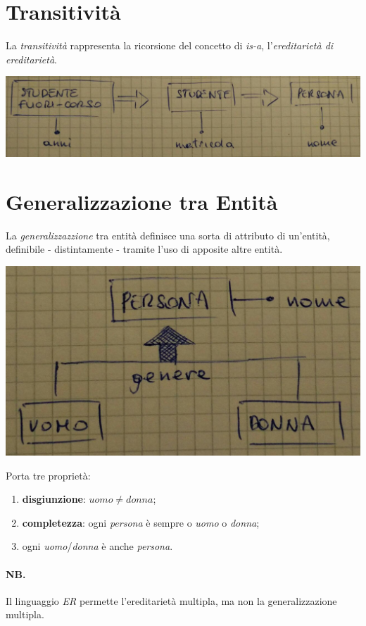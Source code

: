 \section{Transitività}
La \textit{transitività} rappresenta la ricorsione del concetto di \textit{is-a}, l'\textit{ereditarietà di ereditarietà}.
\begin{center}
    \includegraphics[width=.7\textwidth]{res/er-studentefuoricorso-studente-persona.jpg} \hfill
\end{center}

\section{Generalizzazione tra Entità}
La \textit{generalizzazzione} tra entità definisce una sorta di attributo di un'entità, definibile - distintamente - tramite l'uso di apposite altre entità.
\begin{center}
    \includegraphics[width=.5\textwidth]{res/er-persona-uomo-donna.jpg} \hfill
\end{center}
Porta tre proprietà:
\begin{enumerate}
    \item \textbf{disgiunzione}: $uomo \neq donna$;
    \item \textbf{completezza}: ogni \textit{persona} è sempre o \textit{uomo} o \textit{donna};
    \item ogni \textit{uomo}/\textit{donna} è anche \textit{persona}.
\end{enumerate}
\paragraph{NB.}
Il linguaggio \textit{ER} permette l'ereditarietà multipla, ma non la generalizzazione multipla.